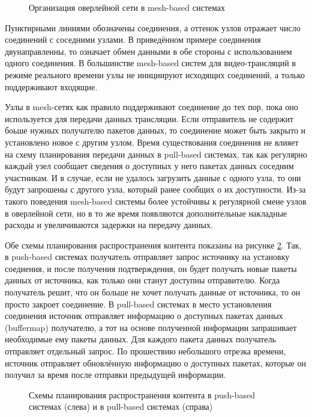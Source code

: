 		\begin{figure}[h]
			\caption{Организация оверлейной сети в mesh-based системах}
			\label{img:mesh-based-system}
		\end{figure}

		Пунктирными линиями обозначены соединения, а оттенок узлов отражает число соединений с соседними узлами.
		В приведённом примере соединения двунаправленны, то означает обмен данными в обе стороны с использованием одного
		соединения. В большинстве mesh-based систем для видео-трансляций в режиме реального времени узлы не инициируют
		исходящих соединений, а только поддерживают входящие.

		Узлы в mesh-сетях как правило поддерживают соединение до тех пор, пока оно используется для передачи данных
		трансляции. Если отправитель не содержит боьше нужных получателю пакетов данных, то соединение может быть
		закрыто и установлено новое с другим узлом. Время существования соединения не влияет на схему планирования
		передачи данных в pull-based системах, так как регулярно каждый узел сообщает сведения о доступных у него
		пакетах данных соседним участникам. И в случае, если не удалось загрузить данные с одного узла, то они
		будут запрошены с другого узла, который ранее сообщих о их доступности. Из-за такого поведения mesh-based
		системы более устойчивы к регулярной смене узлов в оверлейной сети, но в то же время появляются дополнительные
		накладные расходы и увеличиваются задержки на передачу данных.

		Обе схемы планирования распространения контента показаны на рисунке \ref{img:scheduling-scheme}. Так, в
		push-based системах получатель отправляет запрос источнику на установку соедиения, и после получения
		подтверждения, он будет получать новые пакеты данных от источника, как только они станут доступны отправителю.
		Когда получатель решит, что он больше не хочет получать данные от источника, то он просто закроет соединение.
		В pull-based системах в место установления соединения источник отправляет информацию о доступных пакетах данных
		(buffermap) получателю, а тот на основе полученной информации запрашивает необходимые ему пакеты данных. Для
		каждого пакета данных получатель отправляет отдельный запрос. По прошествию небольшого отрезка времени,
		источник отправляет обновлённую информацию о доступных пакетах, которые он получил за время после отправки
		предыдущей информации.

		\begin{figure}[h]
			\caption{Схемы планирования распространения контента в push-based системах (слева) и в pull-based системах
					(справа)}
			\label{img:scheduling-scheme}
		\end{figure}

